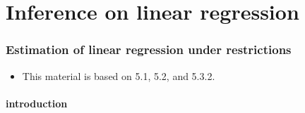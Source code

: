 

\part*{Inference on linear regression}%

\section{Estimation of linear regression under restrictions}

\begin{itemize}
\item This material is based on \citet{Gre_2011} 5.1, 5.2, and 5.3.2.
\end{itemize}

\subsection{introduction}

